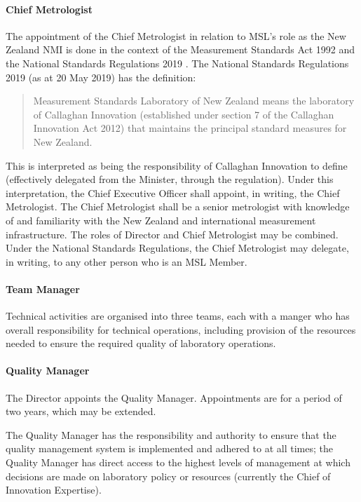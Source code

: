 \paragraph{Chief Metrologist}    

The appointment of the Chief Metrologist in relation to MSL's role as the New Zealand NMI is done in the context of the Measurement Standards Act 1992 \cite{MS_ACT_1992} and the National Standards Regulations 2019 \cite{NS_Regulations}.
The National Standards Regulations 2019 (as at 20 May 2019) has the definition:
\begin{quote}
Measurement Standards Laboratory of New Zealand means the laboratory of Callaghan 
Innovation (established under section 7 of the Callaghan Innovation Act 2012) that maintains 
the principal standard measures for New Zealand.
\end{quote}
This is interpreted as being the responsibility of Callaghan Innovation to define (effectively delegated from the Minister, through the regulation). Under this interpretation, the Chief Executive Officer shall appoint, in writing, the Chief Metrologist. The Chief Metrologist shall be a senior metrologist with knowledge of and familiarity with the New Zealand and international measurement infrastructure. The roles of Director and Chief Metrologist may be combined.
Under the National Standards Regulations, the Chief Metrologist may delegate, in writing, to any other person who is an MSL Member.
\paragraph{Team Manager}
Technical activities are organised into three teams, each with a manger who has overall responsibility for technical operations, including provision of the resources needed to ensure the required quality of laboratory operations. 
\paragraph{Quality Manager}
The Director appoints the Quality Manager. Appointments are for a period of two years, which may be extended. 

The Quality Manager has the responsibility and authority to ensure that the quality management system is implemented and adhered to at all times; the Quality Manager has direct access to the highest levels of management at which decisions are made on laboratory policy or resources (currently the Chief of Innovation Expertise).

